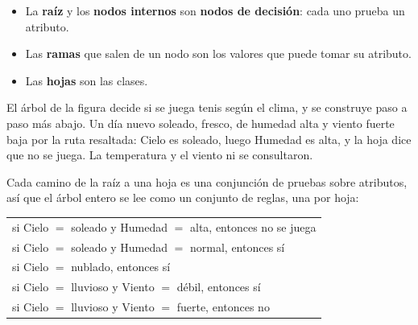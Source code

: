 \documentclass[11pt,letterpaper]{article}
\begin{document}
\begin{itemize}[itemsep=0.3em]
    \item La \textbf{raíz} y los \textbf{nodos internos} son
          \textbf{nodos de decisión}: cada uno prueba un atributo.
    \item Las \textbf{ramas} que salen de un nodo son los valores que
          puede tomar su atributo.
    \item Las \textbf{hojas} son las clases.
\end{itemize}

\begin{center}
\end{center}

El árbol de la figura decide si se juega tenis según el clima, y se
construye paso a paso más abajo. Un día nuevo soleado, fresco, de
humedad alta y viento fuerte baja por la ruta resaltada: Cielo es
soleado, luego Humedad es alta, y la hoja dice que no se juega. La
temperatura y el viento ni se consultaron.

Cada camino de la raíz a una hoja es una conjunción de pruebas sobre
atributos, así que el árbol entero se lee como un conjunto de reglas,
una por hoja:

\begin{center}
\small
\begin{tabular}{l}
    si Cielo $=$ soleado y Humedad $=$ alta, entonces no se juega \\
    si Cielo $=$ soleado y Humedad $=$ normal, entonces sí \\
    si Cielo $=$ nublado, entonces sí \\
    si Cielo $=$ lluvioso y Viento $=$ débil, entonces sí \\
    si Cielo $=$ lluvioso y Viento $=$ fuerte, entonces no
\end{tabular}
\end{center}
\end{document}

